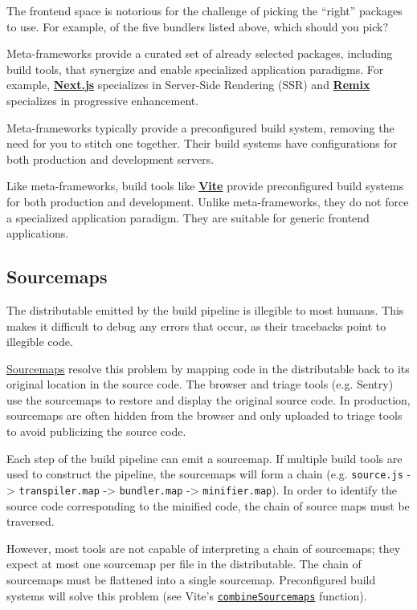 \documentclass{article}
\begin{document}
The frontend space is notorious for the challenge of picking the ``right'' packages to use. For
example, of the five bundlers listed above, which should you pick?

Meta-frameworks provide a curated set of already selected packages, including build tools, that
synergize and enable specialized application paradigms. For example,
\href{https://nextjs.org}{\textbf{Next.js}} specializes in Server-Side Rendering (SSR) and
\href{https://remix.run}{\textbf{Remix}} specializes in progressive enhancement.

Meta-frameworks typically provide a preconfigured build system, removing the need for you to stitch
one together. Their build systems have configurations for both production and development servers.

Like meta-frameworks, build tools like \href{https://vitejs.dev/}{\textbf{Vite}} provide
preconfigured build systems for both production and development. Unlike meta-frameworks, they do not
force a specialized application paradigm. They are suitable for generic frontend applications.

\subsection{Sourcemaps}

The distributable emitted by the build pipeline is illegible to most humans. This makes it difficult
to debug any errors that occur, as their tracebacks point to illegible code.

\href{https://developer.chrome.com/blog/sourcemaps/}{Sourcemaps} resolve this problem by mapping
code in the distributable back to its original location in the source code. The browser and triage
tools (e.g. Sentry) use the sourcemaps to restore and display the original source code. In
production, sourcemaps are often hidden from the browser and only uploaded to triage tools to avoid
publicizing the source code.

Each step of the build pipeline can emit a sourcemap. If multiple build tools are used to construct
the pipeline, the sourcemaps will form a chain (e.g. \texttt{source.js} -> \texttt{transpiler.map}
-> \texttt{bundler.map} -> \texttt{minifier.map}). In order to identify the source code
corresponding to the minified code, the chain of source maps must be traversed.

However, most tools are not capable of interpreting a chain of sourcemaps; they expect at most one
sourcemap per file in the distributable. The chain of sourcemaps must be flattened into a single
sourcemap. Preconfigured build systems will solve this problem (see Vite's
\href{https://github.com/vitejs/vite/blob/feae09fdfab505e58950c915fe5d8dd103d5ffb9/packages/vite/src/node/utils.ts\#L831}{\texttt{combineSourcemaps}}
function).
\end{document}
